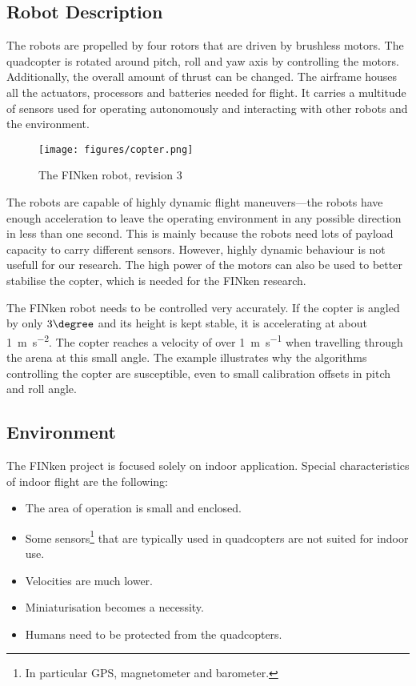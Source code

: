\subsection{Robot Description}

The robots are propelled by four rotors that are driven by brushless motors.
The quadcopter is rotated around pitch, roll and yaw axis by controlling the motors.
Additionally, the overall amount of thrust can be changed.
The airframe houses all the actuators, processors and batteries needed for flight.
It carries a multitude of sensors used for operating autonomously and interacting with other robots and the environment.

\begin{figure}[H]
	\centering
\texttt{[image: figures/copter.png]}
\label{copterfoto}
\caption{The FINken robot, revision 3}
\end{figure}

The robots are capable of highly dynamic flight maneuvers—the robots have enough acceleration to leave the operating environment in any possible direction in less than one second.
This is mainly because the robots need lots of payload capacity to carry different sensors.
However, highly dynamic behaviour is not usefull for our research.
The high power of the motors can also be used to better stabilise the copter, which is needed for the FINken research.

The FINken robot needs to be controlled very accurately.
If the copter is angled by only $3\degree$ and its height is kept stable, it is accelerating at about \SI{1}{\metre\per\square\second}.
The copter reaches a velocity of over \SI{1}{\metre\per\second} when travelling through the arena at this small angle.
The example illustrates why the algorithms controlling the copter are susceptible, even to small calibration offsets in pitch and roll angle.

\subsection{Environment}
\label{env}
The FINken project is focused solely on indoor application.
Special characteristics of indoor flight are the following:
\begin{itemize}
	\item The area of operation is small and enclosed.
	\item Some sensors\footnote{ In particular GPS, magnetometer and barometer. } that are typically used in quadcopters are not suited for indoor use.
	\item Velocities are much lower.
	\item Miniaturisation becomes a necessity.
	\item Humans need to be protected from the quadcopters.
\end{itemize}

